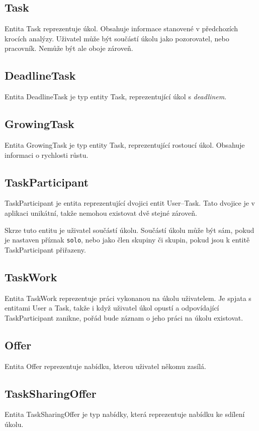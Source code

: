 \documentclass[thesis=B,czech]{FITthesis}[2012/06/26]
\begin{document}
		\subsection{Task}
			Entita Task reprezentuje úkol. Obsahuje informace stanovené v předchozích krocích analýzy. Uživatel může být součástí úkolu jako pozorovatel, nebo pracovník. Nemůže být ale oboje zároveň. 
		
		\subsection{DeadlineTask}
			Entita DeadlineTask je typ entity Task, reprezentující úkol s \textit{deadlinem}. 
		
		\subsection{GrowingTask}
			Entita GrowingTask je typ entity Task, reprezentující rostoucí úkol. Obsahuje informaci o rychlosti růstu.
		
		\subsection{TaskParticipant}
			TaskParticipant je entita reprezentující dvojici entit User--Task. Tato dvojice je v aplikaci unikátní, takže nemohou existovat dvě stejné zároveň. 
			
			Skrze tuto entitu je uživatel součástí úkolu. Součástí úkolu může být sám, pokud je nastaven příznak \texttt{solo}, nebo jako člen skupiny či skupin, pokud jsou k entitě TaskParticipant přiřazeny.
		
		\subsection{TaskWork}
			Entita TaskWork reprezentuje práci vykonanou na úkolu uživatelem. Je spjata s entitami User a Task, takže i když uživatel úkol opustí a odpovídající TaskParticipant zanikne, pořád bude záznam o jeho práci na úkolu existovat.
		
		\subsection{Offer}
			Entita Offer reprezentuje nabídku, kterou uživatel někomu zasílá.
		
		\subsection{TaskSharingOffer}
			Entita TaskSharingOffer je typ nabídky, která reprezentuje nabídku ke sdílení úkolu.
		
\end{document}
